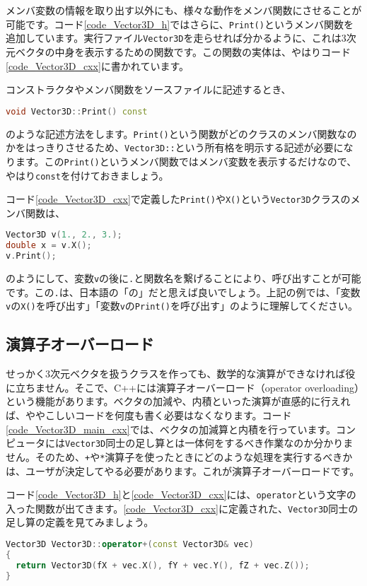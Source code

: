 メンバ変数の情報を取り出す以外にも、様々な動作をメンバ関数にさせることが可能です。コード\ref{code_Vector3D_h}ではさらに、\texttt{Print()}というメンバ関数を追加しています。実行ファイル\texttt{Vector3D}を走らせれば分かるように、これは3次元ベクタの中身を表示するための関数です。この関数の実体は、やはりコード\ref{code_Vector3D_cxx}に書かれています。

コンストラクタやメンバ関数をソースファイルに記述するとき、
\begin{lstlisting}[language=c++]
void Vector3D::Print() const
\end{lstlisting}
のような記述方法をします。\texttt{Print()}という関数がどのクラスのメンバ関数なのかをはっきりさせるため、\texttt{Vector3D::}という所有格を明示する記述が必要になります。この\texttt{Print()}というメンバ関数ではメンバ変数を表示するだけなので、やはり\texttt{const}を付けておきましょう。

コード\ref{code_Vector3D_cxx}で定義した\texttt{Print()}や\texttt{X()}という\texttt{Vector3D}クラスのメンバ関数は、
\begin{lstlisting}[language=c++]
Vector3D v(1., 2., 3.);
double x = v.X();
v.Print();
\end{lstlisting}
のようにして、変数\texttt{v}の後に\texttt{.}と関数名を繋げることにより、呼び出すことが可能です。この\texttt{.}は、日本語の「の」だと思えば良いでしょう。上記の例では、「変数\texttt{v}の\texttt{X()}を呼び出す」「変数\texttt{v}の\texttt{Print()}を呼び出す」のように理解してください。

\subsection{演算子オーバーロード}
\label{subsec:演算子オーバーロード}
せっかく3次元ベクタを扱うクラスを作っても、数学的な演算ができなければ役に立ちません。そこで、C++には演算子オーバーロード（operator overloading）という機能があります。ベクタの加減や、内積といった演算が直感的に行えれば、ややこしいコードを何度も書く必要はなくなります。コード\ref{code_Vector3D_main_cxx}では、ベクタの加減算と内積を行っています。コンピュータには\texttt{Vector3D}同士の足し算とは一体何をするべき作業なのか分かりません。そのため、\texttt{+}や\texttt{*}演算子を使ったときにどのような処理を実行するべきかは、ユーザが決定してやる必要があります。これが演算子オーバーロードです。

コード\ref{code_Vector3D_h}と\ref{code_Vector3D_cxx}には、\texttt{operator}という文字の入った関数が出てきます。\ref{code_Vector3D_cxx}に定義された、\texttt{Vector3D}同士の足し算の定義を見てみましょう。
\begin{lstlisting}[language=c++]
Vector3D Vector3D::operator+(const Vector3D& vec) 
{ 
  return Vector3D(fX + vec.X(), fY + vec.Y(), fZ + vec.Z()); 
} 
\end{lstlisting}

